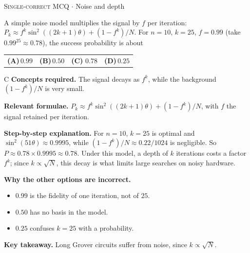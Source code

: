 \documentclass[11pt,a4paper]{article}
\newcommand{\optlabel}[1]{\textbf{(#1)}}
\newcommand{\correctlabel}[1]{\textcolor{okgreen}{\textbf{(#1)}\,\ding{51}}}
\newenvironment{qitem}[1]{\begin{list}{}{\setlength{\leftmargin}{3.3em}\setlength{\labelwidth}{3.1em}%
  \setlength{\labelsep}{0.2em}\setlength{\topsep}{3pt}\setlength{\parsep}{3pt}}\item[\textbf{Q.#1}\hfill]}{\end{list}}
\newcommand{\qsep}{\par\vspace{2pt}{\color{black!15}\hrule}\vspace{4pt}}
\newcommand{\qmeta}[2]{{\footnotesize\color{black!60}\textsc{#1} \;$\cdot$\; #2}\par}
\begin{document}
\begin{qitem}{69}
\qmeta{Single-correct MCQ}{Noise and depth}
A simple noise model multiplies the signal by $f$ per iteration: $P_k \approx f^{k}\sin^2((2k+1)\theta) + (1 - f^{k})/N$. For $n = 10$, $k = 25$, $f = 0.99$ (take $0.99^{25} \approx 0.78$), the success probability is about
\par\smallskip\noindent\begin{tabularx}{\linewidth}{@{}*{4}{L}@{}}
\optlabel{A}\,$0.99$ & \optlabel{B}\,$0.50$ & \correctlabel{C}\,$0.78$ & \optlabel{D}\,$0.25$
\end{tabularx}
\end{qitem}
\begin{solbox}{C}
\textbf{\color{brand}Concepts required.} The signal decays as $f^k$, while the background $(1 - f^k)/N$ is very small.

\textbf{\color{brand}Relevant formulae.} $P_k \approx f^k\sin^2((2k+1)\theta) + (1 - f^k)/N$, with $f$ the signal retained per iteration.

\textbf{\color{brand}Step-by-step explanation.} For $n = 10$, $k = 25$ is optimal and $\sin^2(51\theta) \approx 0.9995$, while $(1 - f^k)/N \approx 0.22/1024$ is negligible. So $P \approx 0.78\times 0.9995 \approx 0.78$. Under this model, a depth of $k$ iterations costs a factor $f^k$;
since $k \propto \sqrt N$, this decay is what limits large searches on noisy hardware.

\textbf{\color{brand}Why the other options are incorrect.}
\begin{itemize}[leftmargin=2.4em, itemsep=1pt, topsep=2pt]
\item[\textbf{(A)}] $0.99$ is the fidelity of one iteration, not of $25$.
\item[\textbf{(B)}] $0.50$ has no basis in the model.
\item[\textbf{(D)}] $0.25$ confuses $k = 25$ with a probability.
\end{itemize}
\textbf{\color{brand}Key takeaway.} Long Grover circuits suffer from noise, since $k \propto \sqrt N$.
\end{solbox}
\qsep
\end{document}

